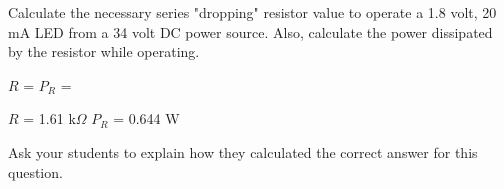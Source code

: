 

Calculate the necessary series "dropping" resistor value to operate a 1.8 volt, 20 mA LED from a 34 volt DC power source.  Also, calculate the power dissipated by the resistor while operating.

\vskip 10pt

$R$ = \hskip 50pt $P_R$ =

\vskip 10pt







$R$ = 1.61 k$\Omega$  \hskip 30pt $P_R$ = 0.644 W







Ask your students to explain how they calculated the correct answer for this question.




